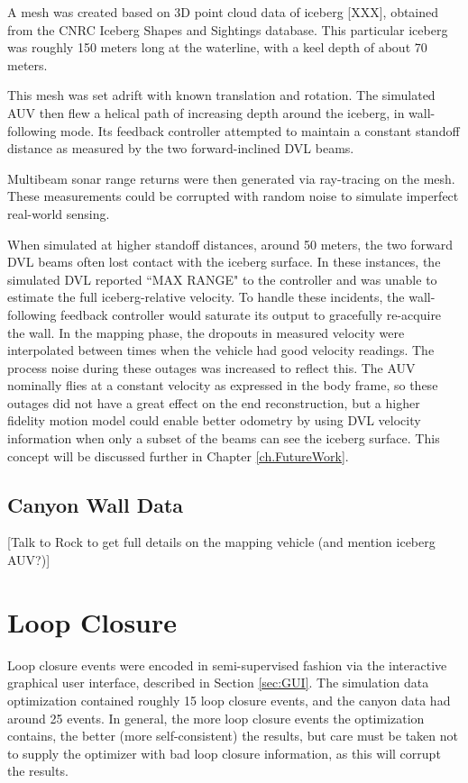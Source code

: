 A mesh was created based on 3D point cloud data of iceberg [XXX], obtained from the CNRC Iceberg Shapes and Sightings database. \cite{?} This particular iceberg was roughly 150 meters long at the waterline, with a keel depth of about 70 meters.

This mesh was set adrift with known translation and rotation. The simulated AUV then flew a helical path of increasing depth around the iceberg, in wall-following mode. Its feedback controller attempted to maintain a constant standoff distance as measured by the two forward-inclined DVL beams.

Multibeam sonar range returns were then generated via ray-tracing on the mesh. These measurements could be corrupted with random noise to simulate imperfect real-world sensing. 

When simulated at higher standoff distances, around 50 meters, the two forward DVL beams often lost contact with the iceberg surface. In these instances, the simulated DVL reported ``MAX RANGE" to the controller and was unable to estimate the full iceberg-relative velocity. To handle these incidents, the wall-following feedback controller would saturate its output to gracefully re-acquire the wall. In the mapping phase, the dropouts in measured velocity were interpolated between times when the vehicle had good velocity readings. The process noise during these outages was increased to reflect this. The AUV nominally flies at a constant velocity as expressed in the body frame, so these outages did not have a great effect on the end reconstruction, but a higher fidelity motion model could enable better odometry by using DVL velocity information when only a subset of the beams can see the iceberg surface. This concept will be discussed further in Chapter \ref{ch.FutureWork}.

\subsection{Canyon Wall Data}

[Talk to Rock to get full details on the mapping vehicle (and mention iceberg AUV?)]

\section{Loop Closure}

Loop closure events were encoded in semi-supervised fashion via the interactive graphical user interface, described in Section \ref{sec:GUI}. The simulation data optimization contained roughly 15 loop closure events, and the canyon data had around 25 events. In general, the more loop closure events the optimization contains, the better (more self-consistent) the results, but care must be taken not to supply the optimizer with bad loop closure information, as this will corrupt the results.

